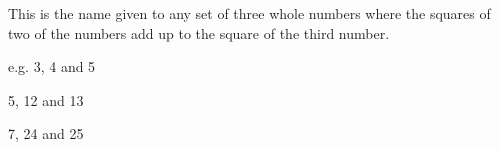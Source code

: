 This is the name given to any set of three whole numbers where the squares of two
of the numbers add up to the square of the third number.
\par
e.g. 3,  4 and  5
\par
5, 12 and 13
\par
7, 24 and 25